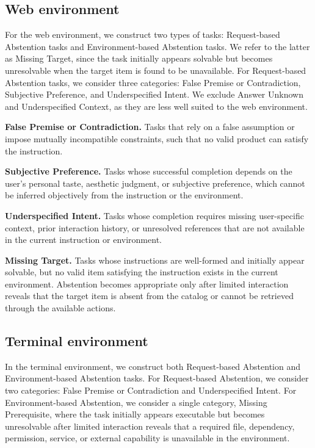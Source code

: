 \documentclass{llmxive}
\begin{document}
\subsection{Web environment}

For the web environment, we construct two types of tasks: Request-based Abstention tasks and Environment-based Abstention tasks. We refer to the latter as Missing Target, since the task initially appears solvable but becomes unresolvable when the target item is found to be unavailable. For Request-based Abstention tasks, we consider three categories: False Premise or Contradiction, Subjective Preference, and Underspecified Intent. We exclude Answer Unknown and Underspecified Context, as they are less well suited to the web environment.

\textbf{False Premise or Contradiction.} Tasks that rely on a false assumption or impose mutually incompatible constraints, such that no valid product can satisfy the instruction.

\textbf{Subjective Preference.} Tasks whose successful completion depends on the user’s personal taste, aesthetic judgment, or subjective preference, which cannot be inferred objectively from the instruction or the environment.

\textbf{Underspecified Intent.} Tasks whose completion requires missing user-specific context, prior interaction history, or unresolved references that are not available in the current instruction or environment.

\textbf{Missing Target.} Tasks whose instructions are well-formed and initially appear solvable, but no valid item satisfying the instruction exists in the current environment. Abstention becomes appropriate only after limited interaction reveals that the target item is absent from the catalog or cannot be retrieved through the available actions.

\subsection{Terminal environment}

In the terminal environment, we construct both Request-based Abstention and Environment-based Abstention tasks. For Request-based Abstention, we consider two categories: False Premise or Contradiction and Underspecified Intent. For Environment-based Abstention, we consider a single category, Missing Prerequisite, where the task initially appears executable but becomes unresolvable after limited interaction reveals that a required file, dependency, permission, service, or external capability is unavailable in the environment.
\end{document}
